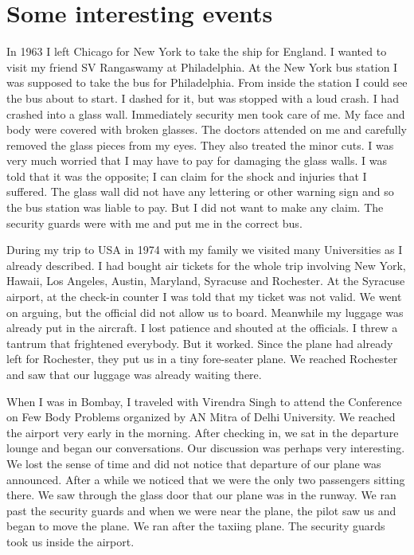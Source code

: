 \section*{Some interesting events}

In 1963 I left Chicago for New York to take the ship for England. I 
wanted to visit my friend SV Rangaswamy at Philadelphia. At the New York 
bus station I was supposed to take the bus for Philadelphia. From inside 
the station I could see the bus about to start. I dashed for it, but was 
stopped with a loud crash. I had crashed into a glass wall. Immediately 
security men took care of me. My face and body were covered with broken 
glasses. The doctors attended on me and carefully removed the glass 
pieces from my eyes. They also treated the minor cuts. I was very much 
worried that I may have to pay for damaging the glass walls. I was told 
that it was the opposite; I can claim for the shock and injuries that I 
suffered. The glass wall did not have any lettering or other warning 
sign and so the bus station was liable to pay. But I did not want to 
make any claim. The security guards were with me and put me in the 
correct bus.
\smallskip

During my trip to USA in 1974 with my family we visited many 
Universities as I already described. I had bought air tickets for the 
whole trip involving New York, Hawaii, Los Angeles, Austin, Maryland, 
Syracuse and Rochester. At the Syracuse airport, at the check-in counter 
I was told that my ticket was not valid. We went on arguing, but the 
official did not allow us to board. Meanwhile my luggage was already put 
in the aircraft. I lost patience and shouted at the officials. I threw a 
tantrum that frightened everybody. But it worked. Since the plane had 
already left for Rochester, they put us in a tiny fore-seater plane. We 
reached Rochester and saw that our luggage was already waiting there.
\smallskip

When I was in Bombay, I traveled with Virendra Singh to attend the 
Conference on Few Body Problems organized by AN Mitra of Delhi 
University. We reached the airport very early in the morning. After 
checking in, we sat in the departure lounge and began our conversations. 
Our discussion was perhaps very interesting. We lost the sense of time 
and did not notice that departure of our plane was announced. After a 
while we noticed that we were the only two passengers sitting there. We 
saw through the glass door that our plane was in the runway. We ran past 
the security guards and when we were near the plane, the pilot saw us 
and began to move the plane. We ran after the taxiing plane. The 
security guards took us inside the airport.
\smallskip

